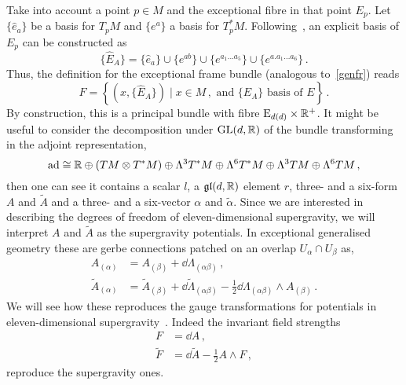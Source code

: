 \documentclass[debug]{phd}
\begin{document}
						Take into account a point $p \in M$ and the exceptional fibre in that point $E_p$.
						Let $\{\hat{e}_a\}$ be a basis for $T_p M$ and $\{e^a\}$ a basis for $T^*_p M$.
						Following~\cite{waldram4}, an explicit basis of $E_p$ can be constructed as
								\begin{equation}
									\{\hat{E}_A\} = \{\hat{e}_a\} \cup \{e^{ab}\} \cup \{e^{a_1 \ldots a_5}\} \cup \{e^{a. a_1 \ldots a_6}\} \, .
								\end{equation}
						Thus, the definition for the exceptional frame bundle (analogous to~\eqref{genfr}) reads
								\begin{equation}
									F = \left\{ \left(x, \{\hat{E}_A\} \right) \mid x \in M \, , \, \, \mbox{and}\, \, \{\hat{E}_A\}\, \, \mbox{basis of}\, \, E\right\} \, .
								\end{equation}
						By construction, this is a principal bundle with fibre $\mathrm{E}_{d(d)} \times \mathbb{R}^+$.
						It might be useful to consider the decomposition under $\mathrm{GL}(d,\mathbb{R})$ of the bundle transforming in the adjoint representation,
								\begin{equation}\label{eq:Ggeom-M}
									\operatorname{ad} \cong \mathbb{R} \oplus (TM\otimes T^*M) \oplus \Lambda^3 T^*M \oplus \Lambda^6 T^*M \oplus \Lambda^3 TM \oplus \Lambda^6 TM \, ,
								\end{equation}
						then one can see it contains a scalar $l$, a $\mathfrak{gl}(d,\mathbb{R})$ element $r$, three- and a six-form $A$ and $\tilde{A}$ and a three- and a six-vector $\alpha$ and $\tilde{\alpha}$.
						Since we are interested in describing the degrees of freedom of eleven-dimensional supergravity, we will interpret $A$ and $\tilde{A}$ as the supergravity potentials.
						In exceptional generalised geometry these are gerbe connections patched on an overlap $U_\alpha \cap U_\beta$ as,
								\begin{equation}
									\begin{split}
										A_{(\alpha)} 		&= A_{(\beta)} + \dd \Lambda_{(\alpha\beta)} \, , \\
										\tilde{A}_{(\alpha)} 	&= \tilde{A}_{(\beta)} + \dd \tilde{\Lambda}_{(\alpha\beta)} - \frac{1}{2} \dd \Lambda_{(\alpha\beta)} \wedge A_{(\beta)} \, .
									\end{split}
								\end{equation}
						We will see how these reproduces the gauge transformations for potentials in eleven-dimensional supergravity~\cite{waldram4, waldram5, hull1}.
						Indeed the invariant field strengths 
								\begin{equation}
									\begin{split}
										F		&= \dd A \, , \\
										\tilde{F} 	&= \dd\tilde{A} - \frac{1}{2} A \wedge F \, ,
									\end{split}
								\end{equation}
						reproduce the supergravity ones.
						
\end{document}
